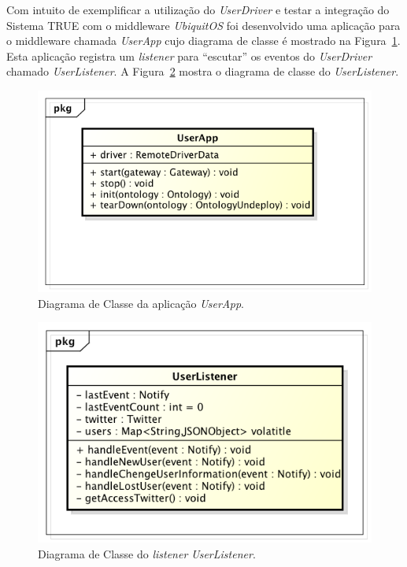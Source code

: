 	Com intuito de exemplificar a utilização do \textit{UserDriver} e testar a integração do Sistema TRUE com o middleware \textit{UbiquitOS} foi desenvolvido uma aplicação para o middleware chamada \textit{UserApp} cujo diagrama de classe é mostrado na Figura~\ref{fig:diagrama-userapp}. Esta aplicação registra um \textit{listener} para ``escutar'' os eventos do \textit{UserDriver} chamado \textit{UserListener}. A Figura~\ref{fig:diagrama-userlistener} mostra o diagrama de classe do \textit{UserListener}.

		\begin{figure}[hbt]
			\begin{center}
				\includegraphics[scale=0.6]{figuras/5.Testes/diagrama-classe-user-ap.png}
			\end{center}
			\caption{Diagrama de Classe da aplicação \textit{UserApp}.}
			\label{fig:diagrama-userapp}
		\end{figure}

		\begin{figure}[hbt]
			\begin{center}
				\includegraphics[scale=0.6]{figuras/5.Testes/diagrama-classe-user-listener.png}
			\end{center}
			\caption{Diagrama de Classe do \textit{listener} \textit{UserListener}.}
			\label{fig:diagrama-userlistener}
		\end{figure}

